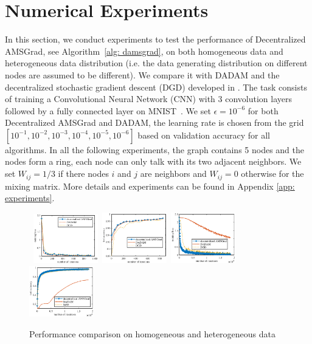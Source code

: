 \documentclass{article} %
\begin{document}
\section{Numerical Experiments}\label{sec:numerical}
In this section, we conduct experiments to test the performance of Decentralized AMSGrad, see Algorithm~\ref{alg: damsgrad}, on both homogeneous data and heterogeneous data distribution (i.e. the data generating distribution on different nodes are assumed to be different). 
We compare it with DADAM and the decentralized stochastic gradient descent (DGD) developed in \citep{lian2017can}. 
The task consists of training a Convolutional Neural Network (CNN) with 3 convolution layers followed by a fully connected layer on MNIST~\citep{lecun1998mnist}. 
We set $\epsilon = 10^{-6}$ for both Decentralized AMSGrad and DADAM, the learning rate is chosen from the grid $[10^{-1}, 10^{-2}, 10^{-3}, 10^{-4}, 10^{-5}, 10^{-6}]$ based on validation accuracy for all algorithms. 
In all the following experiments, the graph contains 5 nodes and the nodes form a ring, each node can only talk with its two adjacent neighbors. We set $W_{ij} = 1/3$ if there nodes $i$ and $j$ are neighbors and $W_{ij} = 0$ otherwise for the mixing matrix. More details and experiments can be found in Appendix \ref{app: experiments}.
\begin{figure}[H]
\mbox{
\includegraphics[width=0.25\textwidth]{train_loss_updated.eps}
\includegraphics[width=0.25\textwidth]{test_acc_updated.eps}
\includegraphics[width=0.25\textwidth]{ub_train_loss.eps}
\includegraphics[width=0.25\textwidth]{ub_test.eps}
}
\caption{Performance comparison on homogeneous and heterogeneous data}
	\label{fig: homo_data}
\end{figure}
\end{document}
